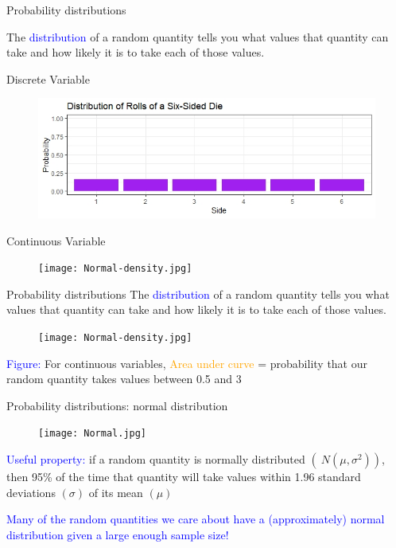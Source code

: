 \documentclass[10pt,t]{beamer}
\begin{document}
\begin{frame}{Probability distributions}
	
\vspace{-3 mm}	
	
	The \textcolor{blue}{distribution} of a random quantity tells you what values that quantity can take and how likely it is to take each of those values.
	\bigskip
	
	Discrete Variable
	\begin{figure}
	\centering \includegraphics[scale=0.35]{discrete_dist}
	\end{figure}
	\smallskip
	
	Continuous Variable
\begin{figure}
	\centering \texttt{[image: Normal-density.jpg]}
\end{figure}
\end{frame}


\begin{frame}{Probability distributions}
The \textcolor{blue}{distribution} of a random quantity tells you what values that quantity can take and how likely it is to take each of those values.

\begin{figure}
	\centering \texttt{[image: Normal-density.jpg]}
\end{figure}

\textcolor{blue}{Figure:} For continuous variables, \textcolor{orange}{Area under curve} = probability that our random quantity takes values between 0.5 and 3

\end{frame}

\begin{frame}{Probability distributions: normal distribution}

\begin{figure}
	\centering \texttt{[image: Normal.jpg]}
\end{figure}

\textcolor{blue}{Useful property:} if a random quantity is normally distributed $(~N(\mu, \sigma^2))$, then 95\% of the time that quantity will take values within 1.96 standard deviations $(\sigma)$ of its mean $(\mu)$

\vspace{0.3cm}

 \textcolor{blue}{Many of the random quantities we care about have a (approximately) normal distribution given a large enough sample size!} 

\end{frame}
\end{document}
